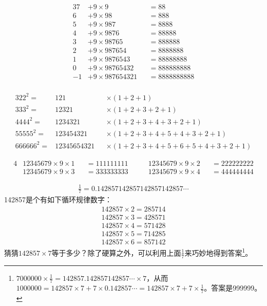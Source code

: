 \begin{example}
  \begin{alignat*}{3}
    7 &+ 9\times 9 &&{}= 88\\
    6 &+ 9\times 98 &&{}= 888\\
    5 &+ 9\times 987 &&{}= 8888\\
    4 &+ 9\times 9876 &&{}= 88888\\
    3 &+ 9\times 98765 &&{}= 888888\\
    2 &+ 9\times 987654 &&{}= 8888888\\
    1 &+ 9\times 9876543 &&{}= 88888888\\
    0 &+ 9\times 98765432 &&{}= 888888888\\
    -1& + 9\times 987654321 &&{}= 8888888888\\
  \end{alignat*}
\end{example}

\begin{example}
  \begin{alignat*}{3}
    22^2={}&121&&\times(1+2+1)\\
    333^2={}&12321&&\times(1+2+3+2+1)\\
    4444^2={}&1234321&&\times(1+2+3+4+3+2+1)\\
    55555^2={}&123454321&&\times(1+2+3+4+5+4+3+2+1)\\
    666666^2={}&12345654321&&\times(1+2+3+4+5+6+5+4+3+2+1)
  \end{alignat*}
\end{example}

\begin{example}[缺8数]
  \begin{alignat*}{4}
    &12345679\times9\times1 &&{}=111111111 &\quad\quad 12345679\times9\times2 &&{}=222222222\\
    &12345679\times9\times3 &&{}=333333333 &\quad\quad 12345679\times9\times4 &&{}=444444444
  \end{alignat*}
\end{example}

\begin{example}[$\frac17$]
  \begin{align*}
    \frac17 = 0.142857142857142857142857\cdots
  \end{align*}
  142857是个有如下循环规律数字：
  \begin{align*}
    142857\times 2 = 285714\\
    142857\times 3 = 428571\\
    142857\times 4 = 571428\\
    142857\times 5 = 714285\\
    142857\times 6 = 857142
  \end{align*}
  猜猜$142857\times 7$等于多少？除了硬算之外，可以利用上面$\frac17$来巧妙地得到答案\footnote{$7000000\times\frac17=142857.142857142857\cdots\times7$，从而$1000000=142857\times7 + 7\times0.142857\cdots=142857\times7+7\times\frac17$。答案是999999。}。
\end{example}

